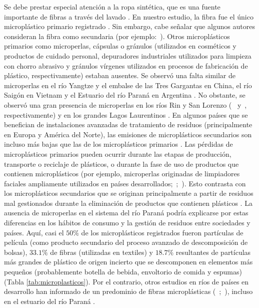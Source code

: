 Se debe prestar especial atención a la ropa sintética, que es una fuente importante de fibras a través del lavado \parencite{Conkle2018}. En nuestro estudio, la fibra fue el único microplástico primario registrado \parencite{Cole2013}. Sin embargo, cabe señalar que algunos autores consideran la fibra como secundaria (por ejemplo:~\cite{dris2015microplastic}). Otros microplásticos primarios como microperlas, cápsulas o gránulos (utilizados en cosméticos y productos de cuidado personal, depuradores industriales utilizados para limpieza con chorro abrasivo y gránulos vírgenes utilizados en procesos de fabricación de plástico, respectivamente) estaban ausentes. Se observó una falta similar de microperlas en el río Yangtze \parencite{ZHANG2015117} y el embalse de las Tres Gargantas \parencite{Zhang2017} en China, el río Saigón en Vietnam \parencite{LAHENS2018661} y el Estuario del río Paraná en Argentina \parencite{PAZOS2018134}. No obstante, se observó una gran presencia de microperlas en los ríos Rin y San Lorenzo (~\cite{Mani2015} y~\cite{doi:10.1139/cjfas-2014-0281}, respectivamente) y en los grandes Lagos Laurentinos \parencite{ERIKSEN2013177}. En algunos países que se benefician de instalaciones avanzadas de tratamiento de residuos (principalmente en Europa y América del Norte), las emisiones de microplásticos secundarios son incluso más bajas que las de los microplásticos primarios \parencite{gouin2015}. Las pérdidas de microplásticos primarios pueden ocurrir durante las etapas de producción, transporte o reciclaje de plásticos, o durante la fase de uso de productos que contienen microplásticos (por ejemplo, microperlas originadas de limpiadores faciales ampliamente utilizados en países desarrollados;~\cite{NAPPER2015178};~\cite{gouin2015}). Esto contrasta con los microplásticos secundarios que se originan principalmente a partir de residuos mal gestionados durante la eliminación de productos que contienen plásticos \parencite{Boucher2017}. La ausencia de microperlas en el sistema del río Paraná podría explicarse por estas diferencias en los hábitos de consumo y la gestión de residuos entre sociedades y países. Aquí, casi el $50\%$ de los microplásticos registrados fueron partículas de película (como producto secundario del proceso avanzado de descomposición de bolsas), $33.1\%$ de fibras (utilizadas en textiles) y $18.7\%$ resultantes de partículas más grandes de plástico de origen incierto que se descomponen en elementos más pequeños (probablemente botella de bebida, envoltorio de comida y espumas)(Tabla \ref{tab:microplasticos}). Por el contrario, otros estudios en ríos de países en desarrollo han informado de un predominio de fibras microplásticas (~\cite{ZHANG2015117};~\cite{LAHENS2018661}), incluso en el estuario del río Paraná \parencite{PAZOS2018134}.

